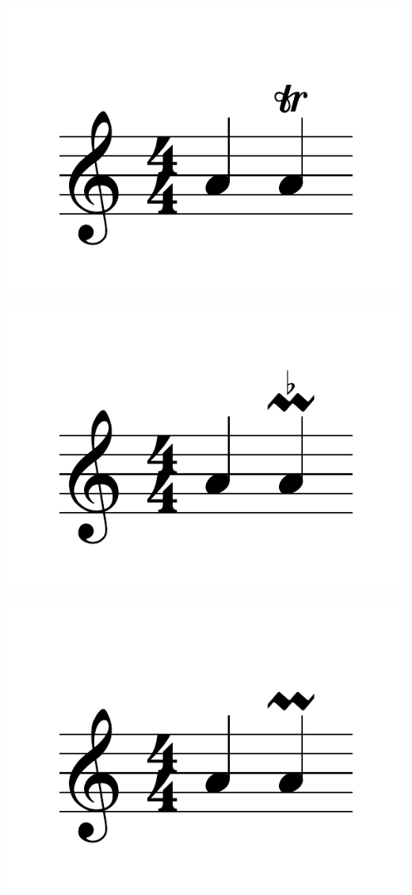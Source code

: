 \documentclass{article}
\begin{document}
\includegraphics[scale=0.5]{figures_tests/pdf/skern/ornaments1.pdf}

\includegraphics[scale=0.5]{figures_tests/pdf/skern/ornaments2.pdf}

\includegraphics[scale=0.5]{figures_tests/pdf/skern/ornaments3.pdf}
\end{document}
